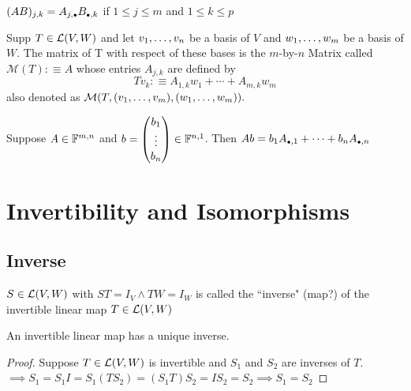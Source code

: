\setcounter{thm}{45}
\begin{thm}
    $(AB)_{j,k} = A_{j, \mathsmaller{\bullet}} B_{\mathsmaller{\bullet}, k}$ if $1 \leq j \leq m$ and $1 \leq k \leq p$
\end{thm}

\setcounter{thm}{30}
\begin{thm}
    Supp $T \in {\mathcal{L}(V,W)}$ and let $v_1, \dots, v_n$ be a basis of $V$ and $w_1, \dots, w_m$ be a basis of $W$. The matrix of T with respect of these bases is the $m$-by-$n$ Matrix called $\mathcal{M}(T) :\equiv A$ whose entries $A_{j,k}$ are defined by
	\begin{equation}
		Tv_k :\equiv A_{1,k}w_1+\cdots+A_{m,k}w_m	
	\end{equation}
	also denoted as $\mathcal{M}(T,(v_1, \dots, v_m), (w_1, \dots, w_m)).$
\end{thm}

\setcounter{thm}{49}
\begin{thm}
    Suppose $A \in {\mathbb{F}}^{m,n}$ and $b=\left(\begin{matrix}b_1\\ \vdots \\ b_n \end{matrix}\right) \in {\mathbb{F}}^{n,1}$. Then $Ab = b_1 A_{\mathsmaller{\bullet}, 1} + \dots + b_n A_{\mathsmaller{\bullet},n}$ 
\end{thm}

\section{Invertibility and Isomorphisms}

\subsection{Inverse}
\setcounter{thm}{58}
\begin{mydef}
    $S\in {\mathcal{L}(V,W)}$ with $ST=I_V \wedge TW = I_W$ is called the ``inverse" (map?) of the invertible linear map $T \in {\mathcal{L}(V,W)}$ 
\end{mydef}

\begin{thm}
    An invertible  linear map has a unique inverse. 
\end{thm}
\begin{proof}
    Suppose $T\in {\mathcal{L}(V,W)}$ is invertible and $S_1$ and $S_2$ are inverses of $T$. $\implies S_1 = S_1 I = S_1 (T S_2) = (S_1 T) S_2 = I S_2 = S_2 \implies S_1 = S_2$ 
\end{proof}


